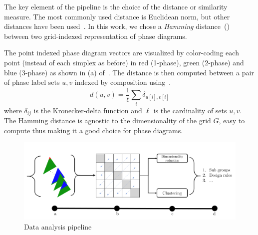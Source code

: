 The key element of the pipeline is the choice of the distance or similarity measure. The most commonly used distance is Euclidean norm, but other distances have been used~\cite{FiftySix}. 
In this work, we chose a \textit{Hamming} distance~() between two grid-indexed representation of phase diagrams.

The point indexed phase diagram vectors are visualized by color-coding each point (instead of each simplex as before) in red (1-phase), green (2-phase) and blue (3-phase) as shown in (a) of~.
The distance is then computed between a pair of phase label sets \(u,v\) indexed by composition using~.
\begin{equation}\label{eq:hamming}
    d(u,v) = \frac{1}{\ell}\sum_{i}\delta_{u[i],v[i]}
\end{equation}
where \(\delta_{ij}\) is the Kronecker-delta function and \(\ell\) is the cardinality of sets \(u,v\).
The Hamming distance is agnostic to the dimensionality of the grid \(G\), easy to compute thus making it a good choice for phase diagrams.  

\begin{figure}[h]
    \centering
    \includegraphics[width=\textwidth]{Chapter-4/figures/analysis_pipepline.png}
    \caption{Data analysis pipeline}
    \label{fig:mlpipeline}
\end{figure}

